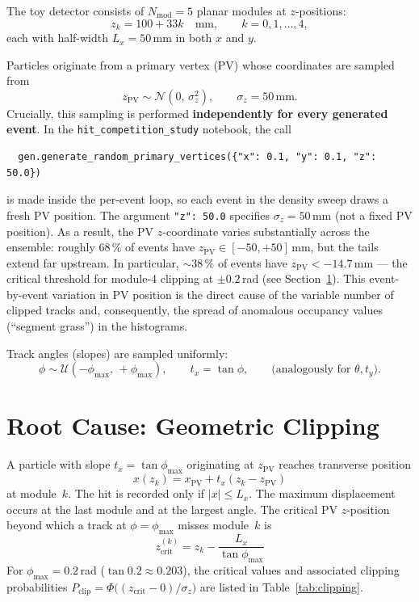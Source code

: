 \documentclass[11pt,a4paper]{article}
\newcommand{\phimax}{\phi_{\mathrm{max}}}
\newcommand{\pvz}{z_{\mathrm{PV}}}
\newcommand{\zcrit}{z_{\mathrm{crit}}}
\newcommand{\halfx}{L_x}
\begin{document}
The toy detector consists of $N_{\text{mod}} = 5$ planar modules at
$z$-positions:
\begin{equation}
  z_k = 100 + 33k \quad \text{mm}, \qquad k = 0, 1, \ldots, 4,
\end{equation}
each with half-width $\halfx = 50$\,mm in both $x$ and $y$.

Particles originate from a primary vertex (PV) whose coordinates are
sampled from
\begin{equation}
  \pvz \sim \mathcal{N}(0,\, \sigma_z^2), \qquad \sigma_z = 50\,\text{mm}.
\end{equation}
Crucially, this sampling is performed \textbf{independently for every
generated event}.  In the \texttt{hit\_competition\_study} notebook, the
call
\begin{verbatim}
  gen.generate_random_primary_vertices({"x": 0.1, "y": 0.1, "z": 50.0})
\end{verbatim}
is made inside the per-event loop, so each event in the density sweep
draws a fresh PV position.  The argument \texttt{"z": 50.0} specifies
$\sigma_z = 50$\,mm (not a fixed PV position).  As a result, the PV
$z$-coordinate varies substantially across the ensemble: roughly 68\,\% of
events have $\pvz \in [-50, +50]$\,mm, but the tails extend far upstream.
In particular, $\sim$38\,\% of events have $\pvz < -14.7$\,mm --- the
critical threshold for module-4 clipping at $\pm 0.2$\,rad (see
Section~\ref{sec:rootcause}).  This event-by-event variation in PV
position is the direct cause of the variable number of clipped tracks and,
consequently, the spread of anomalous occupancy values (``segment grass'')
in the histograms.

Track angles (slopes) are sampled uniformly:
\begin{equation}
  \phi \sim \mathcal{U}(-\phimax,\, +\phimax), \qquad
  t_x = \tan\phi, \qquad
  \text{(analogously for } \theta, t_y\text{)}.
\end{equation}

\section{Root Cause: Geometric Clipping}
\label{sec:rootcause}

A particle with slope $t_x = \tan\phimax$ originating at $\pvz$ reaches
transverse position
\begin{equation}
  x(z_k) = x_{\mathrm{PV}} + t_x (z_k - \pvz)
  \label{eq:xpos}
\end{equation}
at module~$k$.  The hit is recorded only if $|x| \le \halfx$.  The maximum
displacement occurs at the last module and at the largest angle.  The
critical PV $z$-position beyond which a track at $\phi = \phimax$ misses
module~$k$ is
\begin{equation}
  \boxed{\;
    \zcrit^{(k)} = z_k - \frac{\halfx}{\tan\phimax}
  \;}
  \label{eq:zcrit}
\end{equation}
For $\phimax = 0.2$\,rad ($\tan 0.2 \approx 0.203$), the critical values
and associated clipping probabilities
$P_{\text{clip}} = \Phi\!\bigl((\zcrit - 0)/\sigma_z\bigr)$
are listed in Table~\ref{tab:clipping}.
\end{document}
